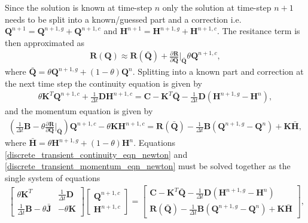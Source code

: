 \documentclass[12pt]{article}
\newcommand{\pardiv}[3]{\frac{\partial^{#1} #2}{\partial #3^{#1}}}
\begin{document}
Since the solution is known at time-step $n$ only the solution at time-step $n+1$ needs to be split into a known/guessed part and a correction i.e. $\mathbf{Q}^{n+1} = \mathbf{Q}^{n+1,g} + \mathbf{Q}^{n+1,c}$ and $\mathbf{H}^{n+1} = \mathbf{H}^{n+1,g} + \mathbf{H}^{n+1,c}$. The resitance term is then approximated as
\begin{align*}
\mathbf{R}(\mathbf{Q}) \approx \mathbf{R}\left(\bar{\mathbf{Q}} \right) + \pardiv{}{\mathbf{R}}{\mathbf{Q}} \Bigg\vert_{\bar{\mathbf{Q}}} \theta \mathbf{Q}^{n+1,c},
\end{align*}
where $\bar{\mathbf{Q}}=\theta \mathbf{Q}^{n+1,g} + (1-\theta) \mathbf{Q}^{n}$. Splitting into a known part and correction at the next time step the continuity equation is given by
\begin{align}\label{discrete_transient_continuity_eqn_newton}
\theta \mathbf{K}^T \mathbf{Q}^{n+1,c} + \frac{1}{\Delta t} \mathbf{D} \mathbf{H}^{n+1,c} = \mathbf{C} - \mathbf{K}^T \bar{\mathbf{Q}} - \frac{1}{\Delta t} \mathbf{D} \left( \mathbf{H}^{n+1,g} - \mathbf{H}^{n} \right),
\end{align}
and the momentum equation is given by
\begin{align}\label{discrete_transient_momentum_eqn_newton}
\left(\frac{1}{\Delta t} \mathbf{B} - \theta \pardiv{}{\mathbf{R}}{\mathbf{Q}} \Bigg\vert_{\bar{\mathbf{Q}}} \right) \mathbf{Q}^{n+1,c} - \theta \mathbf{K} \mathbf{H}^{n+1,c} = \mathbf{R}\left(\bar{\mathbf{Q}} \right) - \frac{1}{\Delta t} \mathbf{B} \left(\mathbf{Q}^{n+1,g} - \mathbf{Q}^{n} \right) + \mathbf{K} \bar{\mathbf{H}},
\end{align}
where $\bar{\mathbf{H}} = \theta \mathbf{H}^{n+1,g} + (1-\theta) \mathbf{H}^{n}$. Equations \eqref{discrete_transient_continuity_eqn_newton} and \eqref{discrete_transient_momentum_eqn_newton} must be solved together as the single system of equations
\begin{align}\label{discrete_transient_system}
\begin{bmatrix}
\theta \mathbf{K}^T & \frac{1}{\Delta t}\mathbf{D} \\
\frac{1}{\Delta t}\mathbf{B}-\theta\bar{\mathbf{J}} & - \theta \mathbf{K}
\end{bmatrix} 
\begin{bmatrix}
\mathbf{Q}^{n+1,c} \\ \mathbf{H}^{n+1,c}
\end{bmatrix} = \begin{bmatrix}
\mathbf{C} - \mathbf{K}^T \bar{\mathbf{Q}} - \frac{1}{\Delta t} \mathbf{D} \left( \mathbf{H}^{n+1,g} - \mathbf{H}^{n} \right) \\
\mathbf{R}\left(\bar{\mathbf{Q}} \right) - \frac{1}{\Delta t} \mathbf{B} \left(\mathbf{Q}^{n+1,g} - \mathbf{Q}^{n} \right) + \mathbf{K} \bar{\mathbf{H}}
\end{bmatrix},
\end{align}
\end{document}
